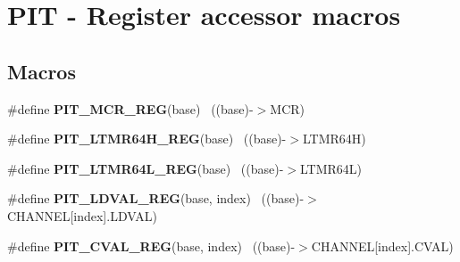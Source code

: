 \hypertarget{group___p_i_t___register___accessor___macros}{}\section{P\+I\+T -\/ Register accessor macros}
\label{group___p_i_t___register___accessor___macros}
\subsection*{Macros}
\begin{DoxyCompactItemize}
\item 
\hypertarget{group___p_i_t___register___accessor___macros_ga557d2712a651961dcd5ffc4f04673239}{}\#define {\bfseries P\+I\+T\+\_\+\+M\+C\+R\+\_\+\+R\+E\+G}(base)                                            ~((base)-\/$>$M\+C\+R)\label{group___p_i_t___register___accessor___macros_ga557d2712a651961dcd5ffc4f04673239}

\item 
\hypertarget{group___p_i_t___register___accessor___macros_gaceb428eb9c33daef7dad0ac03bd5102d}{}\#define {\bfseries P\+I\+T\+\_\+\+L\+T\+M\+R64\+H\+\_\+\+R\+E\+G}(base)                                    ~((base)-\/$>$L\+T\+M\+R64\+H)\label{group___p_i_t___register___accessor___macros_gaceb428eb9c33daef7dad0ac03bd5102d}

\item 
\hypertarget{group___p_i_t___register___accessor___macros_ga963e3dbc0c45569ec8366a0b2a6255f2}{}\#define {\bfseries P\+I\+T\+\_\+\+L\+T\+M\+R64\+L\+\_\+\+R\+E\+G}(base)                                    ~((base)-\/$>$L\+T\+M\+R64\+L)\label{group___p_i_t___register___accessor___macros_ga963e3dbc0c45569ec8366a0b2a6255f2}

\item 
\hypertarget{group___p_i_t___register___accessor___macros_ga2fe8b64df48316de72596736de1bbb00}{}\#define {\bfseries P\+I\+T\+\_\+\+L\+D\+V\+A\+L\+\_\+\+R\+E\+G}(base,  index)                            ~((base)-\/$>$C\+H\+A\+N\+N\+E\+L\mbox{[}index\mbox{]}.L\+D\+V\+A\+L)\label{group___p_i_t___register___accessor___macros_ga2fe8b64df48316de72596736de1bbb00}

\item 
\hypertarget{group___p_i_t___register___accessor___macros_ga0513f6bb6550d10e2877f1918dfdc80e}{}\#define {\bfseries P\+I\+T\+\_\+\+C\+V\+A\+L\+\_\+\+R\+E\+G}(base,  index)                              ~((base)-\/$>$C\+H\+A\+N\+N\+E\+L\mbox{[}index\mbox{]}.C\+V\+A\+L)\label{group___p_i_t___register___accessor___macros_ga0513f6bb6550d10e2877f1918dfdc80e}


\end{DoxyCompactItemize}
